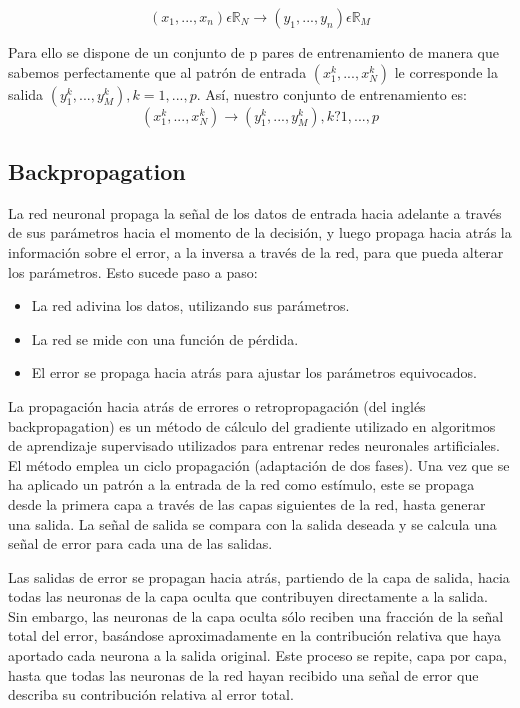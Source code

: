 \begin{equation}
(x_{1},...,x_{n}) \epsilon \mathbb{R}_{N} \rightarrow (y_{1},...,y_{n}) \epsilon \mathbb{R}_{M}
\end{equation}

Para ello se dispone de un conjunto de p pares de entrenamiento de manera que sabemos perfectamente que al patrón de entrada $(x_{1}^{k},...,x_{N}^{k})$ le corresponde la salida $(y_{1}^{k},...,y_{M}^{k}), k = 1,...,p$. Así, nuestro
conjunto de entrenamiento es:
\begin{equation}
{(x_{1}^{k},...,x_{N}^{k}) \rightarrow (y_{1}^{k},...,y_{M}^{k}),k? 1, ..., p}
\end{equation}

\subsection{Backpropagation}
La red neuronal propaga la señal de los datos de entrada hacia adelante a través de sus parámetros hacia el momento de la decisión, y luego propaga hacia atrás la información sobre el error, a la inversa a través de la red, para que pueda alterar los parámetros. Esto sucede paso a paso:
\begin{itemize}
\item La red adivina los datos, utilizando sus parámetros.
\item La red se mide con una función de pérdida.
\item El error se propaga hacia atrás para ajustar los parámetros equivocados.
\end{itemize}

La propagación hacia atrás de errores o retropropagación (del inglés backpropagation) es un método de cálculo del gradiente utilizado en algoritmos de aprendizaje supervisado utilizados para entrenar redes neuronales artificiales. El método emplea un ciclo propagación (adaptación de dos fases). Una vez que se ha aplicado un patrón a la entrada de la red como estímulo, este se propaga desde la primera capa a través de las capas siguientes de la red, hasta generar una salida. La señal de salida se compara con la salida deseada y se calcula una señal de error para cada una de las salidas.

Las salidas de error se propagan hacia atrás, partiendo de la capa de salida, hacia todas las neuronas de la capa oculta que contribuyen directamente a la salida. Sin embargo, las neuronas de la capa oculta sólo reciben una fracción de la señal total del error, basándose aproximadamente en la contribución relativa que haya aportado cada neurona a la salida original. Este proceso se repite, capa por capa, hasta que todas las neuronas de la red hayan recibido una señal de error que describa su contribución relativa al error total.

